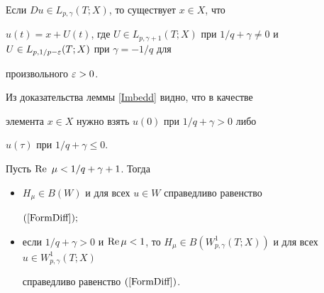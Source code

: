 \begin{cors}\label{Integr}


Если $D u \in L_{p,\gamma}(T;X)$, то существует $x \in X$, что


$u(t)=x+U(t)$, где $U \in L_{p,\gamma+1}(T;X)$ при $1/q+\gamma \ne


0$ и $U \in L_{p,1/p-\eps}(T;X)$ при $\gamma=-1/q$ для


произвольного ${\varepsilon}>0$.


\end{cors}





Из доказательства леммы \ref{Imbedd} видно, что в качестве


элемента $x \in X$ нужно взять $u(0)$ при $1/q+\gamma > 0$ либо


$u(\tau)$ при $1/q+\gamma \le 0$.





\begin{thms}\label{HinV}


Пусть $\operatorname{Re}\ \mu < 1/q+\gamma+1$. Тогда


\begin{itemize}


\item[1)] $H_\mu \in B(W)$ и для всех $u \in W$ справедливо равенство


$(\ref{FormDiff});$


\item[2)] если $1/q+\gamma > 0$ и $\re \mu <1$, то $H_\mu \in


B(W_{p,\gamma}^1(T;X))$ и для всех $u \in W_{p,\gamma}^1(T;X)$


справедливо равенство $(\ref{FormDiff})$.


\end{itemize}


\end{thms}





